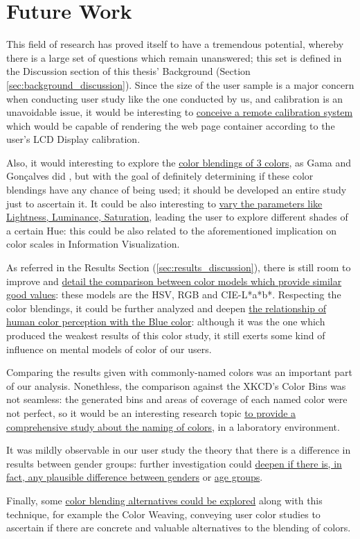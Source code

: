 \section{Future Work}
\label{sec:future_work}
%
This field of research has proved itself to have a tremendous potential, whereby there is a large set of questions which remain unanswered; this set is defined
in the Discussion section of this thesis' Background (Section \ref{sec:background_discussion}). Since the size of the user sample is a major concern when
conducting user study like the one conducted by us, and calibration is an unavoidable issue, it would be interesting to \ul{conceive a remote calibration system}
which would be capable of rendering the web page container according to the user's LCD Display calibration. \par
%
Also, it would interesting to explore the \ul{color blendings of 3 colors}, as Gama and Gonçalves did \cite{Gama20141}, but with the goal of definitely
determining if these color blendings have any chance of being used; it should be developed an entire study just to ascertain it. It could be also interesting
to \ul{vary the parameters like Lightness, Luminance, Saturation}, leading the user to explore different shades of a certain Hue: this could be also related to
the aforementioned implication on color scales in Information Visualization. \par
%
As referred in the Results Section (\ref{sec:results_discussion}), there is still room to improve and \ul{detail the comparison between color models which provide
similar good values}: these models are the HSV, RGB and CIE-L*a*b*. Respecting the color blendings, it could be further analyzed and deepen \ul{the relationship of human
color perception with the Blue color}: although it was the one which produced the weakest results of this color study, it still exerts some kind of influence on
mental models of color of our users. \par
%
Comparing the results given with commonly-named colors was an important part of our analysis. Nonethless, the comparison against the XKCD's Color Bins was not seamless:
the generated bins and areas of coverage of each named color were not perfect, so it would be an interesting research topic \ul{to provide a comprehensive study about
the naming of colors}, in a laboratory environment. \par
%
It was mildly observable in our user study the theory that there is a difference in results between gender groups: further investigation could \ul{deepen if there is, in
fact, any plausible difference between genders} or \ul{age groups}. \par
%
Finally, some \ul{color blending alternatives could be explored} along with this technique, for example the Color Weaving, conveying user color studies to ascertain if
there are concrete and valuable alternatives to the blending of colors.
%

